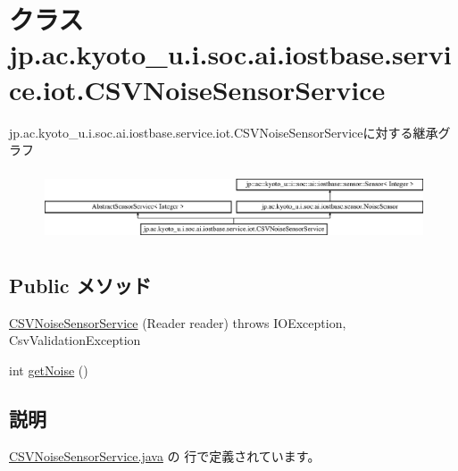 \hypertarget{classjp_1_1ac_1_1kyoto__u_1_1i_1_1soc_1_1ai_1_1iostbase_1_1service_1_1iot_1_1_c_s_v_noise_sensor_service}{\section{クラス jp.\-ac.\-kyoto\-\_\-u.\-i.\-soc.\-ai.\-iostbase.\-service.\-iot.\-C\-S\-V\-Noise\-Sensor\-Service}
\label{classjp_1_1ac_1_1kyoto__u_1_1i_1_1soc_1_1ai_1_1iostbase_1_1service_1_1iot_1_1_c_s_v_noise_sensor_service}
}
jp.\-ac.\-kyoto\-\_\-u.\-i.\-soc.\-ai.\-iostbase.\-service.\-iot.\-C\-S\-V\-Noise\-Sensor\-Serviceに対する継承グラフ\begin{figure}[H]
\begin{center}
\leavevmode
\includegraphics[height=2.100000cm]{classjp_1_1ac_1_1kyoto__u_1_1i_1_1soc_1_1ai_1_1iostbase_1_1service_1_1iot_1_1_c_s_v_noise_sensor_service}
\end{center}
\end{figure}
\subsection*{Public メソッド}
\begin{DoxyCompactItemize}
\item 
\hyperlink{classjp_1_1ac_1_1kyoto__u_1_1i_1_1soc_1_1ai_1_1iostbase_1_1service_1_1iot_1_1_c_s_v_noise_sensor_service_a1ca56be28c35b4ba1e097a2f16db9a1c}{C\-S\-V\-Noise\-Sensor\-Service} (Reader reader)  throws I\-O\-Exception, Csv\-Validation\-Exception 
\item 
int \hyperlink{classjp_1_1ac_1_1kyoto__u_1_1i_1_1soc_1_1ai_1_1iostbase_1_1service_1_1iot_1_1_c_s_v_noise_sensor_service_a604cb0af00394e35003e4fbbf2e8b9a5}{get\-Noise} ()
\end{DoxyCompactItemize}


\subsection{説明}


 \hyperlink{_c_s_v_noise_sensor_service_8java_source}{C\-S\-V\-Noise\-Sensor\-Service.\-java} の  行で定義されています。



